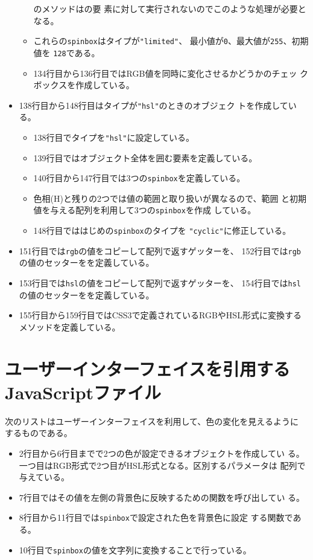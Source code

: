 \begin{itemize}
\begin{itemize}
							のメソッドはの要
							素に対して実行されないのでこのような処理が必要となる。
				\item これらの\texttt{spinbox}はタイプが\texttt{"limited"}、
							最小値が\texttt{0}、最大値が\texttt{255}、初期値を
							\texttt{128}である。
				\item 134行目から136行目ではRGB値を同時に変化させるかどうかのチェッ
							クボックスを作成している。
			 \end{itemize}
 \item 138行目から148行目はタイプが\texttt{"hsl"}のときのオブジェク
			 トを作成している。
			 \begin{itemize}
				\item 138行目でタイプを\texttt{"hsl"}に設定している。
				\item 139行目ではオブジェクト全体を囲む要素を定義している。
				\item 140行目から147行目では3つの\texttt{spinbox}を定義している。
				\item 色相(H)と残りの2つでは値の範囲と取り扱いが異なるので、範囲
							と初期値を与える配列を利用して3つの\texttt{spinbox}を作成
							している。
				\item 148行目でははじめの\texttt{spinbox}のタイプを
							\texttt{"cyclic"}に修正している。
			 \end{itemize}
 \item 151行目では\texttt{rgb}の値をコピーして配列で返すゲッターを、
 152行目では\texttt{rgb}の値のセッターをを定義している。
 \item 153行目では\texttt{hsl}の値をコピーして配列で返すゲッターを、
 154行目では\texttt{hsl}の値のセッターをを定義している。
 \item 155行目から159行目ではCSS3で定義されているRGBやHSL形式に変換する
			 メソッドを定義している。
\end{itemize}
 \section{ユーザーインターフェイスを引用するJavaScriptファイル}
 次のリストはユーザーインターフェイスを利用して、色の変化を見えるように
 するものである。
 \begin{itemize}
	\item 2行目から6行目までで2つの色が設定できるオブジェクトを作成してい
				る。一つ目はRGB形式で2つ目がHSL形式となる。区別するパラメータは
				配列で与えている。
	\item 7行目ではその値を左側の背景色に反映するための関数を呼び出してい
				る。
	\item 8行目から11行目では\texttt{spinbox}で設定された色を背景色に設定
				する関数である。
	\item 10行目で\texttt{spinbox}の値を文字列に変換することで行っている。
 \end{itemize}